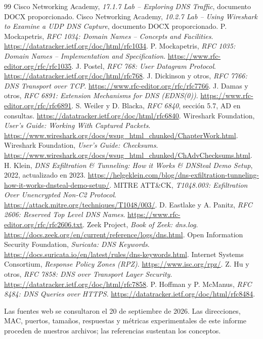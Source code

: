 \documentclass[11pt,a4paper]{article}
\begin{document}
\begin{thebibliography}{99}
 Cisco Networking Academy,
\emph{17.1.7 Lab -- Exploring DNS Traffic}, documento DOCX proporcionado.
 Cisco Networking Academy,
\emph{10.2.7 Lab -- Using Wireshark to Examine a UDP DNS Capture}, documento DOCX proporcionado.
 P. Mockapetris, \emph{RFC 1034: Domain Names -- Concepts and Facilities}.
\url{https://datatracker.ietf.org/doc/html/rfc1034}.
 P. Mockapetris, \emph{RFC 1035: Domain Names -- Implementation and Specification}.
\url{https://www.rfc-editor.org/rfc/rfc1035}.
 J. Postel, \emph{RFC 768: User Datagram Protocol}.
\url{https://datatracker.ietf.org/doc/html/rfc768}.
 J. Dickinson y otros, \emph{RFC 7766: DNS Transport over TCP}.
\url{https://www.rfc-editor.org/rfc/rfc7766}.
 J. Damas y otros, \emph{RFC 6891: Extension Mechanisms for DNS (EDNS(0))}.
\url{https://www.rfc-editor.org/rfc/rfc6891}.
 S. Weiler y D. Blacka, \emph{RFC 6840}, sección 5.7, AD en consultas.
\url{https://datatracker.ietf.org/doc/html/rfc6840}.
 Wireshark Foundation, \emph{User's Guide: Working With Captured Packets}.
\url{https://www.wireshark.org/docs/wsug_html_chunked/ChapterWork.html}.
 Wireshark Foundation, \emph{User's Guide: Checksums}.
\url{https://www.wireshark.org/docs/wsug_html_chunked/ChAdvChecksums.html}.
 H. Klein, \emph{DNS Exfiltration \& Tunneling: How it Works \& DNSteal Demo Setup},
2022, actualizado en 2023.
\url{https://helgeklein.com/blog/dns-exfiltration-tunneling-how-it-works-dnsteal-demo-setup/}.
 MITRE ATT\&CK, \emph{T1048.003: Exfiltration Over Unencrypted Non-C2 Protocol}.
\url{https://attack.mitre.org/techniques/T1048/003/}.
 D. Eastlake y A. Panitz, \emph{RFC 2606: Reserved Top Level DNS Names}.
\url{https://www.rfc-editor.org/rfc/rfc2606.txt}.
 Zeek Project, \emph{Book of Zeek: dns.log}.
\url{https://docs.zeek.org/en/current/reference/logs/dns.html}.
 Open Information Security Foundation, \emph{Suricata: DNS Keywords}.
\url{https://docs.suricata.io/en/latest/rules/dns-keywords.html}.
 Internet Systems Consortium, \emph{Response Policy Zones (RPZ)}.
\url{https://www.isc.org/rpz/}.
 Z. Hu y otros, \emph{RFC 7858: DNS over Transport Layer Security}.
\url{https://datatracker.ietf.org/doc/html/rfc7858}.
 P. Hoffman y P. McManus, \emph{RFC 8484: DNS Queries over HTTPS}.
\url{https://datatracker.ietf.org/doc/html/rfc8484}.
\end{thebibliography}

Las fuentes web se consultaron el 20 de septiembre de 2026. Las direcciones,
MAC, puertos, tamaños, respuestas y métricas experimentales de este informe
proceden de nuestros archivos; las referencias sustentan los conceptos.
\end{document}
